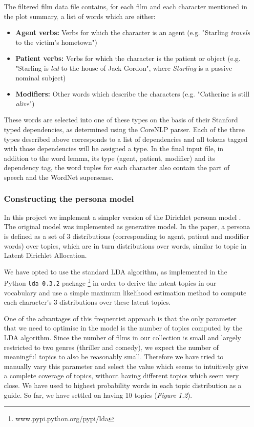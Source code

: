 \documentclass[bsc,frontabs,singlespacing,parskip]{infthesis} %
\begin{document}
The filtered film data file contains, for each film and each character mentioned in the plot summary, a list of words which are either:
\begin{itemize}
	\item \textbf{Agent verbs:} Verbs for which the character is an agent (e.g. "Starling \textit{travels} to the victim's hometown")
	\item \textbf{Patient verbs:} Verbs for which the character is the patient or object (e.g. "Starling is \textit{led} to the house of Jack Gordon", where \textit{Starling} is a passive nominal subject)
	\item \textbf{Modifiers:} Other words which describe the characters (e.g. "Catherine is still \textit{alive}")
\end{itemize}

These words are selected into one of these types on the basis of their Stanford typed dependencies, as determined using the CoreNLP parser. Each of the three types described above corresponds to a list of dependencies and all tokens tagged with those dependencies will be assigned a type. In the final input file, in addition to the word lemma, its type (agent, patient, modifier) and its dependency tag, the word tuples for each character also contain the part of speech and the WordNet supersense.


\subsubsection{Constructing the persona model}
In this project we implement a simpler version of the Dirichlet persona model \cite{Blei2003}. The original model was implemented as generative model. In the paper, a persona is defined as a set of 3 distributions (corresponding to agent, patient and modifier words) over topics, which are in turn distributions over words, similar to topic in Latent Dirichlet Allocation.

We have opted to use the standard LDA algorithm, as implemented in the Python \texttt{lda 0.3.2} package \footnote{ www.pypi.python.org/pypi/lda} in order to derive the latent topics in our vocabulary and use a simple maximum likelihood estimation method to compute each character's 3 distributions over these latent topics.

One of the advantages of this frequentist approach is that the only parameter that we need to optimise in the model is the number of topics computed by the LDA algorithm. Since the number of films in our collection is small and largely restricted to two genres (thriller and comedy), we expect the number of meaningful topics to also be reasonably small. Therefore we have tried to manually vary this parameter and select the value which seems to intuitively give a complete coverage of topics, without having different topics which seem very close. We have used to highest probability words in each topic distribution as a guide. So far, we have settled on having 10 topics (\textit{Figure 1.2}).
\end{document}
